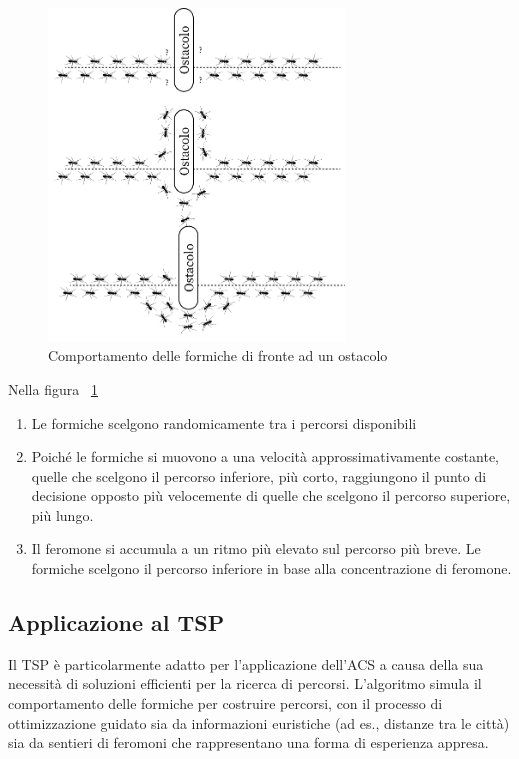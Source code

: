 \begin{figure}[]
	\centering
	\includegraphics[width=0.7\textwidth]{Chapters/Figures/ants_path.png}
	\caption{Comportamento delle formiche di fronte ad un ostacolo}
	\label{fig:obstacle}
\end{figure}

Nella figura ~\ref{fig:obstacle}
\begin{enumerate}
	\item Le formiche scelgono randomicamente tra i percorsi disponibili
	\item Poiché le formiche si muovono a una velocità approssimativamente costante, quelle che scelgono il percorso inferiore, più corto, raggiungono il punto di decisione opposto più velocemente di quelle che scelgono il percorso superiore, più lungo.
	\item  Il feromone si accumula a un ritmo più elevato sul percorso più breve. Le formiche scelgono il percorso inferiore in base alla concentrazione di feromone.
\end{enumerate}


\subsection{Applicazione al \gls{TSP}}
Il \gls{TSP} è particolarmente adatto per l'applicazione dell'\gls{ACS} a causa della sua necessità di soluzioni efficienti per la ricerca di percorsi. L'algoritmo simula il comportamento delle formiche per costruire percorsi, con il processo di ottimizzazione guidato sia da informazioni euristiche (ad es., distanze tra le città) sia da sentieri di feromoni che rappresentano una forma di esperienza appresa\cite{Dorigo1997, Gambardella1995}.

